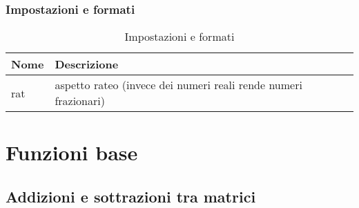 \documentclass{book}
\begin{document}
\subsection{Impostazioni e formati}
\label{sec:formImp}

\begin{table}[ht]
  \centering
  \begin{tabular}{ll}
    {\bf Nome} & {\bf Descrizione}\\\hline
    rat & aspetto rateo (invece dei numeri reali rende numeri frazionari)\\\hline
  \end{tabular}
  \caption{Impostazioni e formati}
  \label{tab:form}
\end{table}
\chapter{Funzioni base}
\label{chap:funbase}

\section{Addizioni e sottrazioni tra matrici}
\label{sec:addesottmtx}
\end{document}
